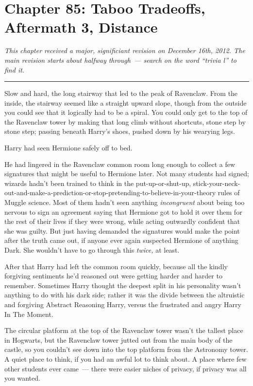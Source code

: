 \chapter{Chapter 85: Taboo Tradeoffs, Aftermath 3, Distance}
\emph{This chapter received a major, significiant revision on December 16th, 2012. The main revision starts about halfway through~--- search on the word ``trivia l'' to find it.}

\begin{center}\rule{3in}{0.4pt}\end{center}

Slow and hard, the long stairway that led to the peak of Ravenclaw. From the inside, the stairway seemed like a straight upward slope, though from the outside you could see that it logically had to be a spiral. You could only get to the top of the Ravenclaw tower by making that long climb without shortcuts, stone step by stone step; passing beneath Harry's shoes, pushed down by his wearying legs.

Harry had seen Hermione safely off to bed.

He had lingered in the Ravenclaw common room long enough to collect a few signatures that might be useful to Hermione later. Not many students had signed; wizards hadn't been trained to think in the put-up-or-shut-up, stick-your-neck-out-and-make-a-prediction-or-stop-pretending-to-believe-in-your-theory rules of Muggle science. Most of them hadn't seen anything \emph{incongruent} about being too nervous to sign an agreement saying that Hermione got to hold it over them for the rest of their lives if they were wrong, while acting outwardly confident that she was guilty. But just having demanded the signatures would make the point after the truth came out, if anyone ever again suspected Hermione of anything Dark. She wouldn't have to go through this \emph{twice,} at least.

After that Harry had left the common room quickly, because all the kindly forgiving sentiments he'd reasoned out were getting harder and harder to remember. Sometimes Harry thought the deepest split in his personality wasn't anything to do with his dark side; rather it was the divide between the altruistic and forgiving Abstract Reasoning Harry, versus the frustrated and angry Harry In The Moment.

The circular platform at the top of the Ravenclaw tower wasn't the tallest place in Hogwarts, but the Ravenclaw tower jutted out from the main body of the castle, so you couldn't see down into the top platform from the Astronomy tower. A quiet place to think, if you had an awful lot to think about. A place where few other students ever came~--- there were easier niches of privacy, if privacy was all you wanted.

